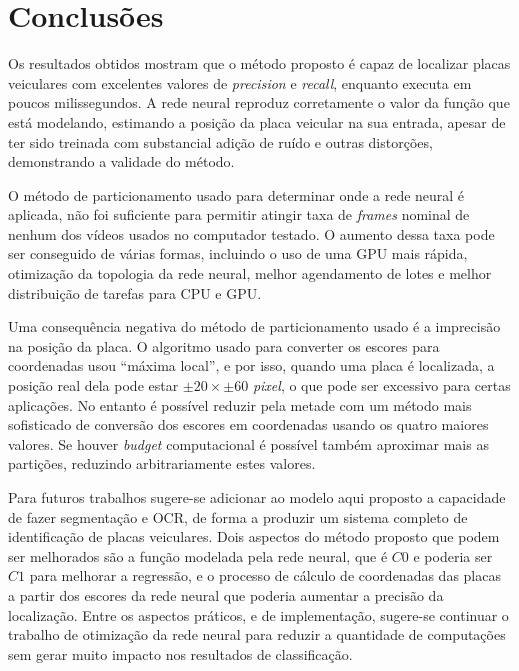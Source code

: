 
\chapter{Conclusões}

Os resultados obtidos mostram que o método proposto é capaz de localizar placas
veiculares com excelentes valores de \emph{precision} e \emph{recall}, enquanto
executa em poucos milissegundos.  
A rede neural reproduz corretamente o valor da função
que está modelando, estimando a posição da placa veicular na sua
entrada, apesar de ter sido treinada com substancial adição de ruído e outras
distorções, demonstrando a validade do método.

O método de particionamento usado para determinar onde a rede neural é
aplicada, não foi suficiente para permitir atingir taxa de \emph{frames}
nominal de nenhum dos vídeos usados no computador testado. O aumento
dessa taxa
pode ser conseguido de várias formas, incluindo o uso de uma GPU mais rápida,
otimização da topologia da rede neural, melhor agendamento de lotes e melhor
distribuição de tarefas para CPU e GPU.

Uma consequência negativa do método de particionamento usado
é a imprecisão na
posição da placa. O algoritmo usado para converter os escores para coordenadas
usou ``máxima local'', e por isso, quando uma placa é localizada, a posição real
dela pode estar $\pm 20 \times \pm 60$ \emph{pixel}, o que pode ser excessivo
para
certas aplicações. No entanto é possível reduzir pela metade com um método mais
sofisticado de conversão dos escores em coordenadas usando os quatro maiores
valores. Se houver \emph{budget} computacional é possível também
aproximar mais as partições, reduzindo arbitrariamente estes valores.

Para futuros trabalhos sugere-se adicionar ao modelo aqui proposto a
capacidade de fazer segmentação e OCR, de forma a produzir um sistema completo
de identificação de placas veiculares. Dois aspectos do método proposto que
podem ser melhorados são a função modelada pela rede neural, que é $C0$ e
poderia ser $C1$ para melhorar a regressão, e o processo de cálculo de
coordenadas das placas a partir dos escores da rede neural que poderia
aumentar a precisão da localização.  Entre os aspectos práticos, e de
implementação, sugere-se continuar o trabalho de otimização da rede
neural para reduzir a quantidade de computações sem gerar muito impacto nos
resultados de classificação.

